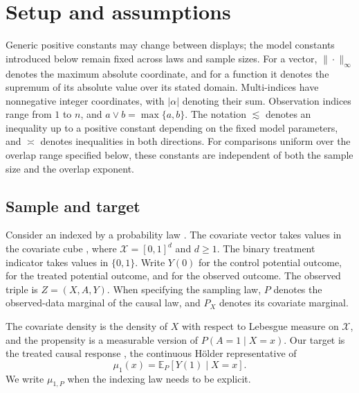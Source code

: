 \section{Setup and assumptions}

Generic positive constants may change between displays; the model constants introduced below remain fixed across laws and sample sizes. For a vector, \(\|\cdot\|_\infty\) denotes the maximum absolute coordinate, and for a function it denotes the supremum of its absolute value over its stated domain. Multi-indices have nonnegative integer coordinates, with \(|\alpha|\) denoting their sum. Observation indices range from \(1\) to \(n\), and \(a\vee b=\max\{a,b\}\). The notation \(\lesssim\) denotes an inequality up to a positive constant depending on the fixed model parameters, and \(\asymp\) denotes inequalities in both directions. For comparisons uniform over the overlap range specified below, these constants are independent of both the sample size and the overlap exponent.

\subsection{Sample and target}

Consider an  indexed by a probability law . The covariate vector  takes values in the covariate cube , where \(\mathcal X=[0,1]^d\) and \(d\ge1\). The binary treatment indicator  takes values in \(\{0,1\}\). Write \(Y(0)\) for the control potential outcome,  for the treated potential outcome, and  for the observed outcome. The observed triple  is \(Z=(X,A,Y)\). When specifying the sampling law, \(P\) denotes the observed-data marginal of the causal law, and \(P_X\) denotes its covariate marginal.

The covariate density  is the density of \(X\) with respect to Lebesgue measure on \(\mathcal X\), and the propensity  is a measurable version of \(P(A=1\mid X=x)\). Our target is the treated causal response , the continuous Hölder representative of
\[
\mu_1(x)=\mathbb E_P[Y(1)\mid X=x].
\]
We write \(\mu_{1,P}\) when the indexing law needs to be explicit.

